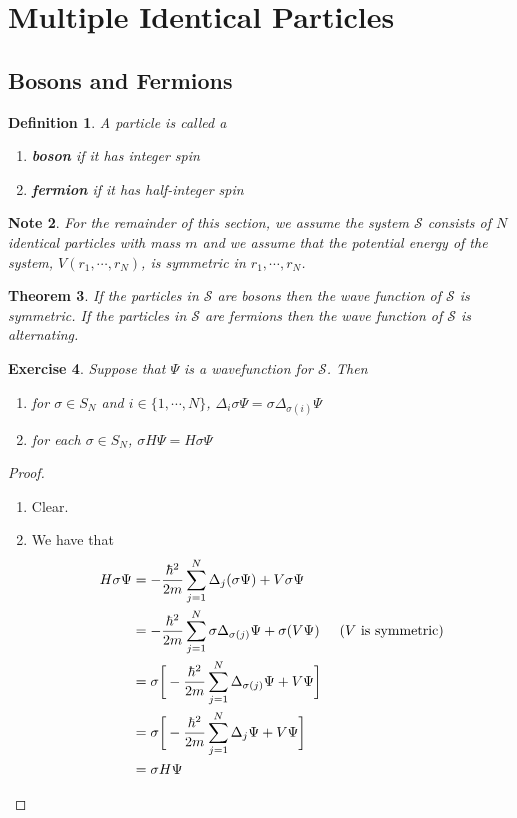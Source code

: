 \documentclass[12pt]{amsart}
\newtheorem{thm}{Theorem}[section]
\newtheorem{defn}[thm]{Definition}
\newtheorem{note}[thm]{Note}
\newtheorem{ex}[thm]{Exercise}
\newcommand{\Del}{\Delta}
\newcommand{\sig}{\sigma}
\newcommand{\MS}{\mathcal{S}}
\begin{document}
\newpage

\section{Multiple Identical Particles}

\subsection{Bosons and Fermions}

\begin{defn}
	A particle is called a 
	\begin{enumerate}
		\item \textbf{boson} if it has integer spin 
		\item \textbf{fermion} if it has half-integer spin
	\end{enumerate}
\end{defn}

\begin{note}
	For the remainder of this section, we assume the system $\MS$ consists of $N$ identical particles with mass $m$ and we assume that the potential energy of the system, $V(r_1, \cdots, r_N)$, is symmetric in $r_1, \cdots, r_N$. 
\end{note}

\begin{thm}
	If the particles in $\MS$ are bosons then the wave function of $\MS$ is symmetric. If the particles in $\MS$ are fermions then the wave function of $\MS$ is alternating.
\end{thm}

\begin{ex}
	Suppose that $\Psi$ is a wavefunction for $\MS$. Then 
	\begin{enumerate}
		\item for $\sig \in S_N$ and $i \in \{1, \cdots, N\}$, $\Del_i \sig \Psi = \sig \Del_{\sig(i)} \Psi$
		\item for each $\sig \in S_N$, $\sig H \Psi= H \sig \Psi$
	\end{enumerate}
\end{ex}

\begin{proof}\
	\begin{enumerate}
		\item Clear.
		\item We have that 
		\begin{align*}
			H \sig \Psi
			&= -\frac{\hbar^2}{2m}\sum_{j=1}^N \Del_j (\sig \Psi)    + V \sig \Psi \\
			&= -\frac{\hbar^2}{2m}\sum_{j=1}^N \sig \Del_{\sig(j)} \Psi   + \sig (V \Psi) \hspace{.5cm} \text{($V$ is symmetric)}\\ 
			&=  \sig \bigg[ -\frac{\hbar^2}{2m}  \sum_{j=1}^N  \Del_{\sig(j)} \Psi   +  V \Psi \bigg] \\ 
			&= \sig \bigg[-\frac{\hbar^2}{2m}  \sum_{j=1}^N  \Del_j \Psi   +  V \Psi \bigg] \\ 
			&= \sig H \Psi
		\end{align*}
	\end{enumerate}
\end{proof}
\end{document}
